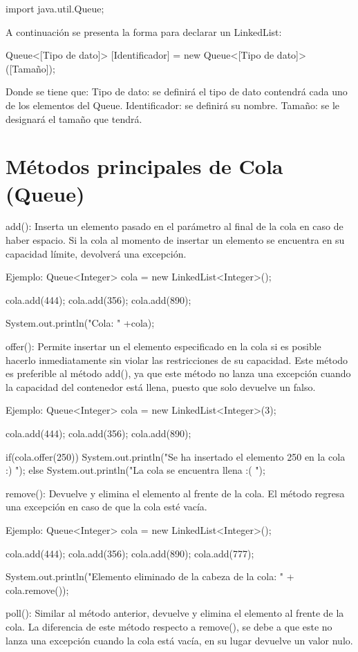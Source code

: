 \documentclass[12pt, letterpaper]{article} %
\begin{document}
import java.util.Queue;

A continuación se presenta la forma para declarar un LinkedList:

Queue<[Tipo de dato]> [Identificador] = new Queue<[Tipo de dato]>([Tamaño]);

Donde se tiene que:
Tipo de dato: se definirá el tipo de dato contendrá cada uno de los elementos del Queue.
Identificador: se definirá su nombre.
Tamaño: se le designará el tamaño que tendrá.

\section*{Métodos principales de Cola (Queue)}
add():
Inserta un elemento pasado en el parámetro al final de la cola en caso de haber espacio. Si la cola al momento de insertar un elemento se encuentra en su capacidad límite, devolverá una excepción. 

Ejemplo:
Queue<Integer> cola = new LinkedList<Integer>();

cola.add(444);
cola.add(356);
cola.add(890);

System.out.println("Cola: " +cola);

offer():
Permite insertar un el elemento especificado en la cola si es posible hacerlo inmediatamente sin violar las restricciones de su capacidad. Este método es preferible al método add(), ya que este método no lanza una excepción cuando la capacidad del contenedor está llena, puesto que solo devuelve un falso.

Ejemplo:
Queue<Integer> cola = new LinkedList<Integer>(3);

cola.add(444);
cola.add(356);
cola.add(890);

if(cola.offer(250)){
System.out.println("Se ha insertado el elemento 250 en la cola :) ");
}
else{
	System.out.println("La cola se encuentra llena :( ");
}


remove():
Devuelve y elimina el elemento al frente de la cola. El método regresa una excepción en caso de que la cola esté vacía.

Ejemplo:
Queue<Integer> cola = new LinkedList<Integer>();

cola.add(444);
cola.add(356);
cola.add(890);
cola.add(777);

System.out.println("Elemento eliminado de la cabeza de la cola: " + cola.remove());


poll():
Similar al método anterior, devuelve y elimina el elemento al frente de la cola. La diferencia de este método respecto a remove(), se debe a que este no lanza una excepción cuando la cola está vacía, en su lugar devuelve un valor nulo.
\end{document}
